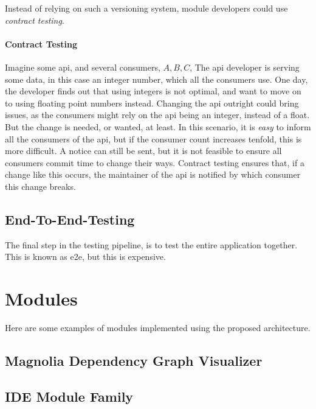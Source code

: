 Instead of relying on such a versioning system, module developers could use
\textit{contract testing}. 

\paragraph{Contract Testing} Imagine some \gls{api}, and several consumers,
$A, B, C$, The \gls{api} developer is serving some data, in this case an
integer number, which all the consumers use. One day, the developer finds out
that using integers is not optimal, and want to move on to using floating point
numbers instead. Changing the \gls{api} outright could bring issues, as the
consumers might rely on the \gls{api} being an integer, instead of a float. But
the change is needed, or wanted, at least. In this scenario, it is \textit{easy}
to inform all the consumers of the \gls{api}, but if the consumer count
increases tenfold, this is more difficult. A notice can still be sent, but it is
not feasible to ensure all consumers commit time to change their ways. Contract
testing ensures that, if a change like this occurs, the maintainer of the
\gls{api} is notified by which consumer this change breaks.

\subsection{End-To-End-Testing}

The final step in the testing pipeline, is to test the entire application
together. This is known as \gls{e2e}, but this is expensive.

\section{Modules}


Here are some examples of modules implemented using the proposed architecture.

\subsection{Magnolia Dependency Graph Visualizer}


\subsection{IDE Module Family}

